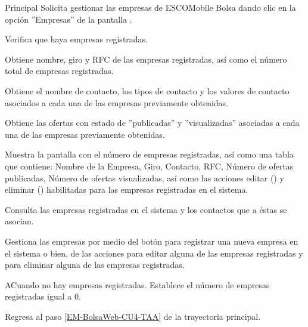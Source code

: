 \begin{UCtrayectoria}{Principal}
	\UCpaso [\UCactor] Solicita gestionar las empresas de ESCOMobile Bolsa dando clic en la opción ''Empresas'' de la pantalla .

	\UCpaso Verifica que haya empresas registradas.  

	\UCpaso Obtiene nombre, giro y RFC de las empresas registradas, así como el número total de empresas registradas.

	\UCpaso Obtiene el nombre de contacto, los tipos de contacto y los valores de contacto asociados a cada una de las empresas previamente obtenidas.

	\UCpaso Obtiene las ofertas con estado de ''publicadas'' y ''visualizadas'' asociadas a cada una de las empresas previamente obtenidas.

	\UCpaso Muestra la pantalla  con el número de empresas registradas, así como una tabla que contiene: Nombre de la Empresa, Giro, Contacto, RFC, Número de ofertas publicadas, Número de ofertas visualizadas, así como las acciones editar () y eliminar () habilitadas para las empresas registradas en el sistema. \label{EM-BolsaWeb-CU4-TAA}

	\UCpaso [\UCactor] Consulta las empresas registradas en el sistema y los contactos que a éstas se asocian. 

	\UCpaso [\UCactor] Gestiona las empresas por medio del botón  para registrar una nueva empresa en el sistema o bien, de las acciones  para editar alguna de las empresas registradas y  para eliminar alguna de las empresas registradas.

\end{UCtrayectoria}

\begin{UCtrayectoriaA}{A}{Cuando no hay empresas registradas.}
	\UCpaso Establece el número de empresas registradas igual a 0. 

	\UCpaso Regresa al paso \ref{EM-BolsaWeb-CU4-TAA} de la trayectoria principal.
\end{UCtrayectoriaA}



